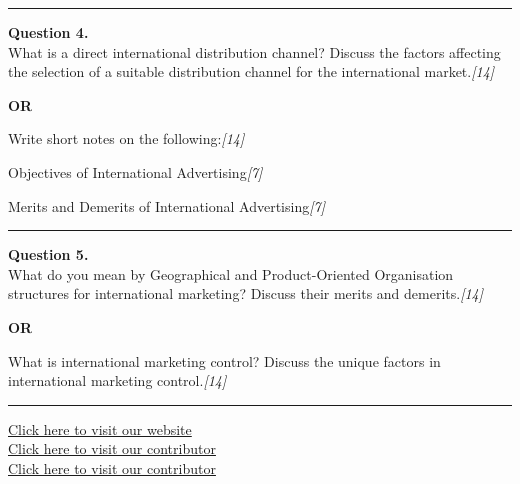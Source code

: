 \documentclass[11pt,a4paper]{article}
\newcommand{\pts}[1]{\hfill   \textit{[#1]}}
\begin{document}
\medskip\rule{\linewidth}{0.2pt}




\noindent   \textbf{Question 4.} \\
What is a direct international distribution channel? Discuss the factors affecting the selection of a suitable distribution channel for the international market.\pts{14}

\centerline{   \textbf{OR}}

Write short notes on the following:\pts{14}

\begin{parts}
  \item Objectives of International Advertising\pts{7}
  \item Merits and Demerits of International Advertising\pts{7}
\end{parts}

\medskip\rule{\linewidth}{0.2pt}




\noindent   \textbf{Question 5.} \\
What do you mean by Geographical and Product-Oriented Organisation structures for international marketing? Discuss their merits and demerits.\pts{14}

\centerline{   \textbf{OR}}

What is international marketing control? Discuss the unique factors in international marketing control.\pts{14}

\vfill
\rule{\linewidth}{0.4pt}

\begin{center}\small
\href{https://bhu-exam.vercel.app/}{Click here to visit our website}\\[4pt]
\href{https://me-aryan.vercel.app/}{Click here to visit our contributor}\\[4pt]
\href{https://quashan-me.vercel.app/}{Click here to visit our contributor}
\end{center}
\end{document}

